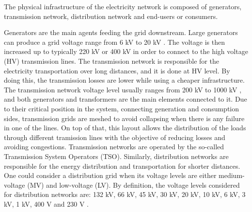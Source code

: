 The physical infrastructure of the electricity network is composed of generators, transmission network, distribution network and end-users or consumers.

%

Generators are the main agents feeding the grid downstream. Large generators can produce a grid voltage range from 6 kV to 20 kV \cite{Gomez-Exposito2008}. The voltage is then increased up to typically 220 kV or 400 kV in order to connect to the high voltage (HV) transmission lines. The transmission network is responsible for the electricity transportation over long distances, and it is done at HV level. By doing this, the transmission losses are lower while using a cheaper infrastructure. The transmission network voltage level usually ranges from 200 kV to 1000 kV \cite{Erbach2016}, and both generators and transformers are the main elements connected to it. Due to their critical position in the system, connecting generation and consumption sides, transmission grids are meshed to avoid collapsing when there is any failure in one of the lines. On top of that, this layout allows the distribution of the loads through different tramission lines with the objective of reducing losses and avoiding congestions. Transmission networks are operated by the so-called Transmission System Operators (TSO). Similarly, distribution networks are responsible for the energy distribution and transportation for shorter distances. One could consider a distribution grid when its voltage levels are either medium-voltage (MV) and low-voltage (LV). By definition, the voltage levels considered for distribution networks are: 132 kV, 66 kV, 45 kV, 30 kV, 20 kV, 10 kV, 6 kV, 3 kV, 1 kV, 400 V and 230 V \cite{Gomez-Exposito2008, Erbach2016}. 
\newpage
